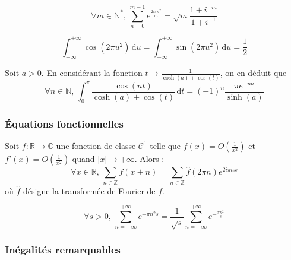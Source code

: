
  \begin{application}
    \[ \forall m \in \mathbb{N}^*, \, \sum_{n=0}^{m-1} e^{\frac{2i\pi n^2}{m}} = \sqrt{m} \frac{1+i^{-m}}{1+i^{-1}} \]
  \end{application}

  \begin{application}
    \[ \int_{-\infty}^{+\infty} \cos(2 \pi u^2) \, \mathrm{d}u = \int_{-\infty}^{+\infty} \sin(2 \pi u^2) \, \mathrm{d}u = \frac{1}{2} \]
  \end{application}


  \begin{application}
    Soit $a > 0$. En considérant la fonction $t \mapsto \frac{1}{\cosh(a) + \cos(t)}$, on en déduit que
    \[ \forall n \in \mathbb{N}, \, \int_{0}^{\pi} \frac{\cos(nt)}{\cosh(a) + \cos(t)} \, \mathrm{d}t = (-1)^n \frac{\pi e^{-na}}{\sinh(a)} \]
  \end{application}

  \subsubsection{Équations fonctionnelles}


  \begin{theorem}
    Soit $f : \mathbb{R} \rightarrow \mathbb{C}$ une fonction de classe $\mathcal{C}^1$ telle que $f(x) = O \left( \frac{1}{x^2} \right)$ et $f'(x) = O \left( \frac{1}{x^2} \right)$ quand $|x| \longrightarrow +\infty$. Alors :
    \[ \forall x \in \mathbb{R}, \, \sum_{n \in \mathbb{Z}} f(x+n) = \sum_{n \in \mathbb{Z}} \widehat{f}(2 \pi n) e^{2 i \pi n x} \]
    où $\widehat{f}$ désigne la transformée de Fourier de $f$.
  \end{theorem}

  \begin{application}
    \[ \forall s > 0, \, \sum_{n=-\infty}^{+\infty} e^{-\pi n^2 s} = \frac{1}{\sqrt{s}} \sum_{n=-\infty}^{+\infty} e^{-\frac{\pi n^2}{s}} \]
  \end{application}

  \subsubsection{Inégalités remarquables}

